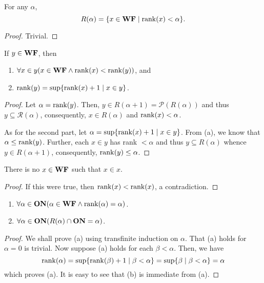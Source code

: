 \begin{lemma}
    For any $\alpha$, 
    \begin{equation*}
        R(\alpha) = \{x\in\mathbf{WF}\mid \operatorname{rank}(x) < \alpha\}.
    \end{equation*}
\end{lemma}
\begin{proof}
    Trivial.
\end{proof}

\begin{lemma}
    If $y\in\mathbf{WF}$, then 
    \begin{enumerate}[label=(\alph*)]
        \item $\forall x\in y(x\in\mathbf{WF}\wedge\operatorname{rank}(x) < \operatorname{rank}(y))$, and 
        \item $\operatorname{rank}(y) = \sup\{\operatorname{rank}(x) + 1\mid x\in y\}$.
    \end{enumerate}
\end{lemma}
\begin{proof}
    Let $\alpha = \operatorname{rank}(y)$. Then, $y\in R(\alpha + 1) = \mathscr P(R(\alpha))$ and thus $y\subseteq\mathscr R(\alpha)$, consequently, $x\in R(\alpha)$ and $\operatorname{rank}(x) < \alpha$.

    As for the second part, let $\alpha = \sup\{\operatorname{rank}(x) + 1\mid x\in y\}$. From (a), we know that $\alpha\le\operatorname{rank}(y)$. Further, each $x\in y$ has rank $< \alpha$ and thus $y\subseteq R(\alpha)$ whence $y\in R(\alpha + 1)$, consequently, $\operatorname{rank}(y)\le\alpha$.
\end{proof}

\begin{corollary}
    There is no $x\in\mathbf{WF}$ such that $x\in x$.
\end{corollary}
\begin{proof}
    If this were true, then $\operatorname{rank}(x) < \operatorname{rank}(x)$, a contradiction.
\end{proof}

\begin{lemma}
    \begin{enumerate}[label=(\alph*)]
        \item $\forall\alpha\in\mathbf{ON}(\alpha\in\mathbf{WF}\wedge\operatorname{rank}(\alpha) = \alpha)$.
        \item $\forall\alpha\in\mathbf{ON}(R(\alpha)\cap\mathbf{ON} = \alpha)$.
    \end{enumerate}
\end{lemma}
\begin{proof}
    We shall prove (a) using transfinite induction on $\alpha$. That (a) holds for $\alpha = 0$ is trivial. Now suppose (a) holds for each $\beta < \alpha$. Then, we have 
    \begin{equation*}
        \operatorname{rank}(\alpha) = \sup\{\operatorname{rank}(\beta) + 1\mid\beta < \alpha\} = \sup\{\beta\mid\beta < \alpha\} = \alpha
    \end{equation*}
    which proves (a). It is easy to see that (b) is immediate from (a).
\end{proof}

